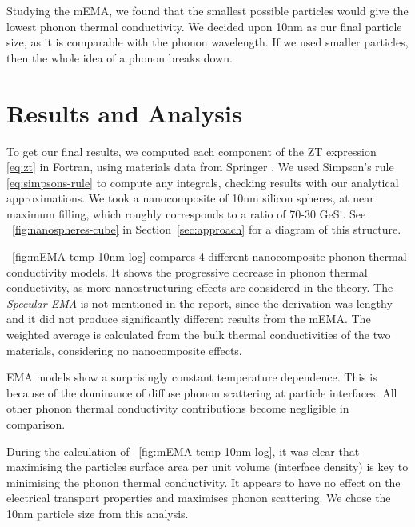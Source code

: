 \documentclass[12pt]{article}
\newcommand{\figref}[2][\figurename~]{#1\ref{#2}}
\newcommand{\secref}[2][Section~]{#1\ref{#2}}
\begin{document}
Studying the mEMA, we found that the smallest possible particles would give the lowest phonon thermal conductivity. We decided upon 10nm as our final particle size, as it is comparable with the phonon wavelength. If we used smaller particles, then the whole idea of a phonon breaks down.

\section{Results and Analysis}
To get our final results, we computed each component of the ZT expression \eqref{eq:zt} in Fortran, using materials data from Springer \cite{springer}. We used Simpson's rule \eqref{eq:simpsons-rule} to compute any integrals, checking results with our analytical approximations. We took a nanocomposite of 10nm silicon spheres, at near maximum filling, which roughly corresponds to a ratio of 70-30 GeSi. See \figref{fig:nanospheres-cube} in \secref{sec:approach} for a diagram of this structure.

\figref{fig:mEMA-temp-10nm-log} compares 4 different nanocomposite phonon thermal conductivity models. It shows the progressive decrease in phonon thermal conductivity, as more nanostructuring effects are considered in the theory. The \emph{Specular EMA} \cite{sema} is not mentioned in the report, since the derivation was lengthy and it did not produce significantly different results from the mEMA. The weighted average is calculated from the bulk thermal conductivities of the two materials, considering no nanocomposite effects. 

EMA models show a surprisingly constant temperature dependence. This is because of the dominance of diffuse phonon scattering at particle interfaces. All other phonon thermal conductivity contributions become negligible in comparison.

During the calculation of \figref{fig:mEMA-temp-10nm-log}, it was clear that maximising the particles surface area per unit volume (interface density) is key to minimising the phonon thermal conductivity. It appears to have no effect on the electrical transport properties and maximises phonon scattering. We chose the 10nm particle size from this analysis.

\end{document}
